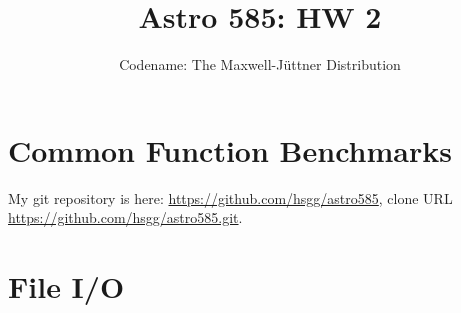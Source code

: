 \documentclass[11pt]{article}
\title{Astro 585: HW 2}
\author{Codename: The Maxwell-Jüttner Distribution}
\begin{document}
\maketitle

\section{Common Function Benchmarks}
My git repository is here: \url{https://github.com/hsgg/astro585}, clone URL
\url{https://github.com/hsgg/astro585.git}.

\section{File I/O}

\end{document}
